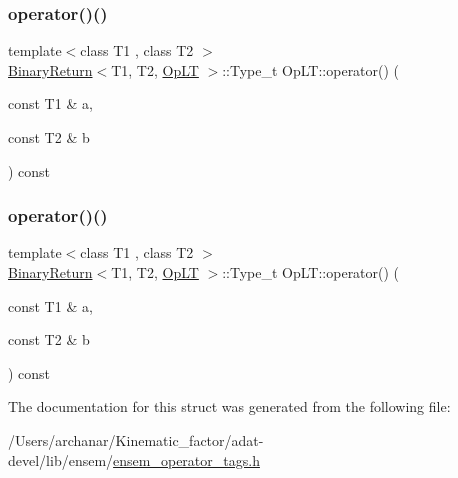 \mbox{\label{structOpLT_a2f128753d950366b68138d206e76ceec}} 
\subsubsection{\texorpdfstring{operator()()}{operator()()}\hspace{0.1cm}{\footnotesize\ttfamily [2/3]}}
{\footnotesize\ttfamily template$<$class T1 , class T2 $>$ \\
\mbox{\hyperlink{structBinaryReturn}{Binary\+Return}}$<$T1, T2, \mbox{\hyperlink{structOpLT}{Op\+LT}} $>$\+::Type\+\_\+t Op\+L\+T\+::operator() (\begin{DoxyParamCaption}\item[{const T1 \&}]{a,  }\item[{const T2 \&}]{b }\end{DoxyParamCaption}) const\hspace{0.3cm}{\ttfamily [inline]}}

\mbox{\label{structOpLT_a2f128753d950366b68138d206e76ceec}} 
\subsubsection{\texorpdfstring{operator()()}{operator()()}\hspace{0.1cm}{\footnotesize\ttfamily [3/3]}}
{\footnotesize\ttfamily template$<$class T1 , class T2 $>$ \\
\mbox{\hyperlink{structBinaryReturn}{Binary\+Return}}$<$T1, T2, \mbox{\hyperlink{structOpLT}{Op\+LT}} $>$\+::Type\+\_\+t Op\+L\+T\+::operator() (\begin{DoxyParamCaption}\item[{const T1 \&}]{a,  }\item[{const T2 \&}]{b }\end{DoxyParamCaption}) const\hspace{0.3cm}{\ttfamily [inline]}}



The documentation for this struct was generated from the following file\+:\begin{DoxyCompactItemize}
\item 
/\+Users/archanar/\+Kinematic\+\_\+factor/adat-\/devel/lib/ensem/\mbox{\hyperlink{adat-devel_2lib_2ensem_2ensem__operator__tags_8h}{ensem\+\_\+operator\+\_\+tags.\+h}}\end{DoxyCompactItemize}
